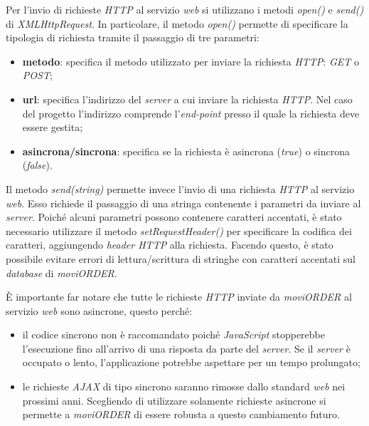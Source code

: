 Per l'invio di richieste \textit{HTTP} al servizio \textit{web} si utilizzano i metodi \textit{open()} e \textit{send()} di \textit{XMLHttpRequest}. In particolare, il metodo \textit{open()} permette di specificare la tipologia di richiesta tramite il passaggio di tre parametri:
	\begin{itemize}
		\item \textbf{metodo}: specifica il metodo utilizzato per inviare la richiesta \textit{HTTP}: \textit{GET} o \textit{POST};
		\item \textbf{url}: specifica l'indirizzo del \textit{server} a cui inviare la richiesta \textit{HTTP}. Nel caso del progetto l'indirizzo comprende l'\textit{end-point} presso il quale la richiesta deve essere gestita;
		\item \textbf{asincrona/sincrona}: specifica se la richiesta è asincrona (\textit{true}) o sincrona (\textit{false}).
	\end{itemize}
Il metodo \textit{send(string)} permette invece l'invio di una richiesta \textit{HTTP} al servizio \textit{web}. Esso richiede il passaggio di una stringa contenente i parametri da inviare al \textit{server}. Poiché alcuni parametri possono contenere caratteri accentati, è stato necessario utilizzare il metodo \textit{setRequestHeader()} per specificare la codifica dei caratteri, aggiungendo \textit{header HTTP} alla richiesta. Facendo questo, è stato possibile evitare errori di lettura/scrittura di stringhe con caratteri accentati sul \textit{database} di \textit{moviORDER}. 

È importante far notare che tutte le richieste \textit{HTTP} inviate da \textit{moviORDER} al servizio \textit{web} sono asincrone, questo perché:
\begin{itemize}
	\item il codice sincrono non è raccomandato poiché \textit{JavaScript} stopperebbe l'esecuzione fino all'arrivo di una risposta da parte del \textit{server}. Se il \textit{server} è occupato o lento, l'applicazione potrebbe aspettare per un tempo prolungato;
	\item le richieste \textit{AJAX} di tipo sincrono saranno rimosse dallo standard \textit{web} nei prossimi anni. Scegliendo di utilizzare solamente richieste asincrone si permette a \textit{moviORDER} di essere robusta a questo cambiamento futuro.
\end{itemize} 

